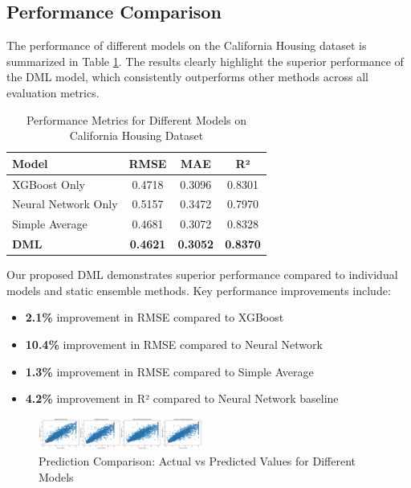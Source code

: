 \documentclass[10pt,journal,compsoc]{IEEEtran}
\begin{document}
\subsection{Performance Comparison}

The performance of different models on the California Housing dataset is summarized in Table \ref{tab:performance_summary}. The results clearly highlight the superior performance of the DML model, which consistently outperforms other methods across all evaluation metrics.

\begin{table}[htbp]
\centering
\caption{Performance Metrics for Different Models on California Housing Dataset}
\label{tab:performance_summary}
\renewcommand{\arraystretch}{1.2} %
\begin{tabular}{|l|c|c|c|}
\hline
\textbf{Model} & \textbf{RMSE} & \textbf{MAE} & \textbf{R²} \\
\hline
XGBoost Only        & 0.4718 & 0.3096 & 0.8301 \\
Neural Network Only & 0.5157 & 0.3472 & 0.7970 \\
Simple Average      & 0.4681 & 0.3072 & 0.8328 \\
\textbf{DML}        & \textbf{0.4621} & \textbf{0.3052} & \textbf{0.8370} \\
\hline
\end{tabular}
\end{table}

Our proposed DML demonstrates superior performance compared to individual models and static ensemble methods. Key performance improvements include:

\begin{itemize}
    \item \textbf{2.1\%} improvement in RMSE compared to XGBoost
    \item \textbf{10.4\%} improvement in RMSE compared to Neural Network
    \item \textbf{1.3\%} improvement in RMSE compared to Simple Average
    \item \textbf{4.2\%} improvement in R² compared to Neural Network baseline
\end{itemize}

\begin{figure}[htbp]
\centerline{\includegraphics[width=0.48\textwidth]{prediction_comparison.png}}
\caption{Prediction Comparison: Actual vs Predicted Values for Different Models}
\label{fig:prediction_comparison}
\end{figure}
\end{document}
